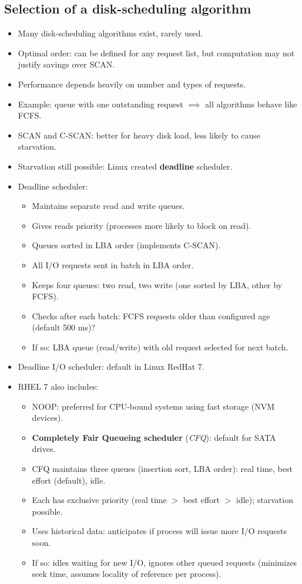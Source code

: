 \subsection{Selection of a disk-scheduling algorithm}
\begin{itemize}
    \item Many disk-scheduling algorithms exist, rarely used.
    \item Optimal order: can be defined for any request list, but computation may not justify savings over SCAN.
    \item Performance depends heavily on number and types of requests.
    \item Example: queue with one outstanding request $\implies$ all algorithms behave like FCFS.
    \item SCAN and C-SCAN: better for heavy disk load, less likely to cause starvation.
    \item Starvation still possible: Linux created \textbf{deadline} scheduler.
    \item Deadline scheduler:
    \begin{itemize}
        \item Maintains separate read and write queues.
        \item Gives reads priority (processes more likely to block on read).
        \item Queues sorted in LBA order (implements C-SCAN).
        \item All I/O requests sent in batch in LBA order.
        \item Keeps four queues: two read, two write (one sorted by LBA, other by FCFS).
        \item Checks after each batch: FCFS requests older than configured age (default 500 ms)?
        \item If so: LBA queue (read/write) with old request selected for next batch.
    \end{itemize}
    \item Deadline I/O scheduler: default in Linux RedHat 7.
    \item RHEL 7 also includes:
    \begin{itemize}
        \item NOOP: preferred for CPU-bound systems using fast storage (NVM devices).
        \item \textbf{Completely Fair Queueing scheduler} (\textit{CFQ}): default for SATA drives.
        \item CFQ maintains three queues (insertion sort, LBA order): real time, best effort (default), idle.
        \item Each has exclusive priority (real time $>$ best effort $>$ idle); starvation possible.
        \item Uses historical data: anticipates if process will issue more I/O requests soon.
        \item If so: idles waiting for new I/O, ignores other queued requests (minimizes seek time, assumes locality of reference per process).
    \end{itemize}
\end{itemize}

